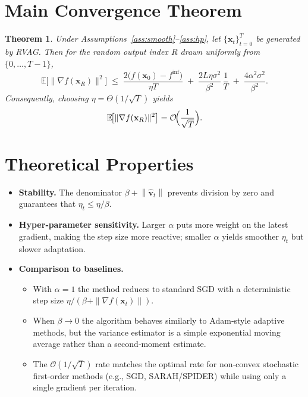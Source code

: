 \documentclass{article}
\newtheorem{theorem}{Theorem}
\newcommand{\E}{\mathbb{E}}
\newcommand{\norm}[1]{\left\|#1\right\|}
\newcommand{\grad}{\nabla}
\begin{document}
\section*{Main Convergence Theorem}
\begin{theorem}\label{thm:main}
Under Assumptions~\ref{ass:smooth}–\ref{ass:hp}, let $\{ \mathbf{x}_t\}_{t=0}^{T}$ be generated by RVAG. Then for the random output index $R$ drawn uniformly from $\{0,\dots,T-1\}$,
\[
\E\!\bigl[\|\grad f(\mathbf{x}_{R})\|^{2}\bigr]
\;\le\;
\frac{2\bigl(f(\mathbf{x}_0)-f^{\inf}\bigr)}{\eta T}
\;+\;
\frac{2L\eta\sigma^{2}}{\beta^{2}}\,\frac{1}{T}
\;+\;
\frac{4\alpha^{2}\sigma^{2}}{\beta^{2}} .
\]
Consequently, choosing $\eta=\Theta(1/\sqrt{T})$ yields 
\[
\E\!\bigl[\|\grad f(\mathbf{x}_{R})\|^{2}\bigr]=\mathcal{O}\!\Bigl(\frac{1}{\sqrt{T}}\Bigr).
\]
\end{theorem}

\section*{Theoretical Properties}
\begin{itemize}[leftmargin=*]
\item \textbf{Stability.} The denominator $\beta+\norm{\hat{\mathbf{v}}_t}$ prevents division by zero and guarantees that $\eta_t\le \eta/\beta$.
\item \textbf{Hyper‑parameter sensitivity.} Larger $\alpha$ puts more weight on the latest gradient, making the step size more reactive; smaller $\alpha$ yields smoother $\eta_t$ but slower adaptation.
\item \textbf{Comparison to baselines.}
    \begin{itemize}
        \item With $\alpha=1$ the method reduces to standard SGD with a deterministic step size $\eta/(\beta+\|\grad f(\mathbf{x}_t)\|)$.
        \item When $\beta\to0$ the algorithm behaves similarly to Adam‑style adaptive methods, but the variance estimator is a simple exponential moving average rather than a second‑moment estimate.
        \item The $\mathcal{O}(1/\sqrt{T})$ rate matches the optimal rate for non‑convex stochastic first‑order methods (e.g., SGD, SARAH/SPIDER) while using only a single gradient per iteration.
    \end{itemize}
\end{itemize}
\end{document}
